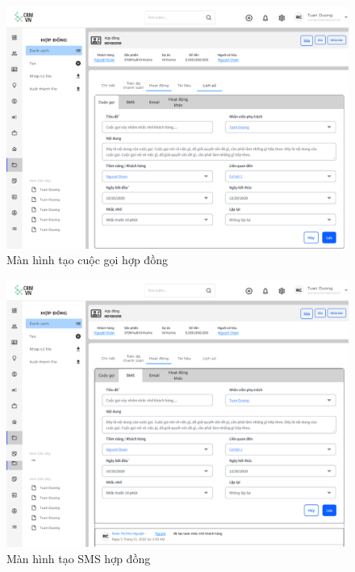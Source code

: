 \documentclass[12pt,a4paper]{article}
\begin{document}
\begin{enumerate}
\begin{itemize}
            \begin{figure}[H]
                \centering \includegraphics[width=\textwidth]{Img/Nguyet/Hopdong/cuocgoi.png}
                \vspace{0.5cm}
                \caption{Màn hình tạo cuộc gọi hợp đồng }
                \label{cuogoihd}
            \end{figure}


            \begin{figure}[H]
                \centering \includegraphics[width=\textwidth]{Img/Nguyet/Hopdong/sms.png}
                \vspace{0.5cm}
                \caption{Màn hình tạo SMS hợp đồng }
                \label{smshd}
            \end{figure}


\end{itemize}
\end{enumerate}
\end{document}

